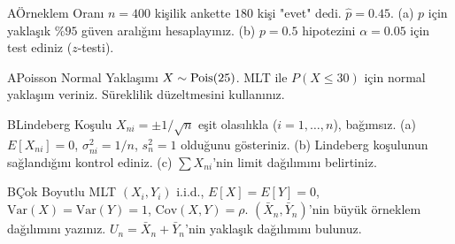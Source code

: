 

\begin{alistirma}[Al.8.5]{A}{Örneklem Oranı}
$n=400$ kişilik ankette $180$ kişi "evet" dedi. $\hat{p}=0.45$.
(a) $p$ için yaklaşık $\%95$ güven aralığını hesaplayınız.
(b) $p=0.5$ hipotezini $\alpha=0.05$ için test ediniz ($z$-testi).
\end{alistirma}
\alistirmalar


\begin{alistirma}[Al.8.6]{A}{Poisson Normal Yaklaşımı}
$X \sim \operatorname{Pois}(25)$. MLT ile $P(X \leq 30)$ için normal yaklaşım veriniz.
Süreklilik düzeltmesini kullanınız.
\end{alistirma}

\begin{alistirma}[Al.8.7]{B}{Lindeberg Koşulu}
$X_{ni} = \pm 1/\sqrt{n}$ eşit olasılıkla ($i = 1,\ldots,n$), bağımsız.
(a) $E[X_{ni}]=0$, $\sigma_{ni}^2=1/n$, $s_n^2=1$ olduğunu gösteriniz.
(b) Lindeberg koşulunun sağlandığını kontrol ediniz.
(c) $\sum X_{ni}$'nin limit dağılımını belirtiniz.
\end{alistirma}

\begin{alistirma}[Al.8.8]{B}{Çok Boyutlu MLT}
$(X_i, Y_i)$ i.i.d., $E[X]=E[Y]=0$, $\mathrm{Var}(X)=\mathrm{Var}(Y)=1$, $\mathrm{Cov}(X,Y)=\rho$.
$(\bar{X}_n, \bar{Y}_n)$'nin büyük örneklem dağılımını yazınız.
$U_n = \bar{X}_n + \bar{Y}_n$'nin yaklaşık dağılımını bulunuz.
\end{alistirma}

